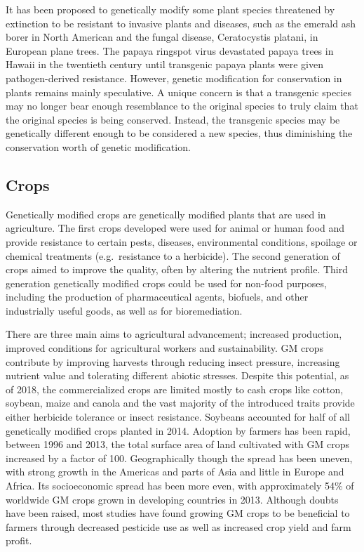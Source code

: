 It has been proposed to genetically modify some plant species threatened by extinction to be resistant to invasive plants and diseases, such as the emerald ash borer in North American and the fungal disease, Ceratocystis platani, in European plane trees. The papaya ringspot virus devastated papaya trees in Hawaii in the twentieth century until transgenic papaya plants were given pathogen-derived resistance. However, genetic modification for conservation in plants remains mainly speculative. A unique concern is that a transgenic species may no longer bear enough resemblance to the original species to truly claim that the original species is being conserved. Instead, the transgenic species may be genetically different enough to be considered a new species, thus diminishing the conservation worth of genetic modification.

\hypertarget{crops}{%
\subsection{Crops}\label{crops}}

Genetically modified crops are genetically modified plants that are used in agriculture. The first crops developed were used for animal or human food and provide resistance to certain pests, diseases, environmental conditions, spoilage or chemical treatments (e.g.~resistance to a herbicide). The second generation of crops aimed to improve the quality, often by altering the nutrient profile. Third generation genetically modified crops could be used for non-food purposes, including the production of pharmaceutical agents, biofuels, and other industrially useful goods, as well as for bioremediation.

There are three main aims to agricultural advancement; increased production, improved conditions for agricultural workers and sustainability. GM crops contribute by improving harvests through reducing insect pressure, increasing nutrient value and tolerating different abiotic stresses. Despite this potential, as of 2018, the commercialized crops are limited mostly to cash crops like cotton, soybean, maize and canola and the vast majority of the introduced traits provide either herbicide tolerance or insect resistance. Soybeans accounted for half of all genetically modified crops planted in 2014. Adoption by farmers has been rapid, between 1996 and 2013, the total surface area of land cultivated with GM crops increased by a factor of 100. Geographically though the spread has been uneven, with strong growth in the Americas and parts of Asia and little in Europe and Africa. Its socioeconomic spread has been more even, with approximately 54\% of worldwide GM crops grown in developing countries in 2013. Although doubts have been raised, most studies have found growing GM crops to be beneficial to farmers through decreased pesticide use as well as increased crop yield and farm profit.

